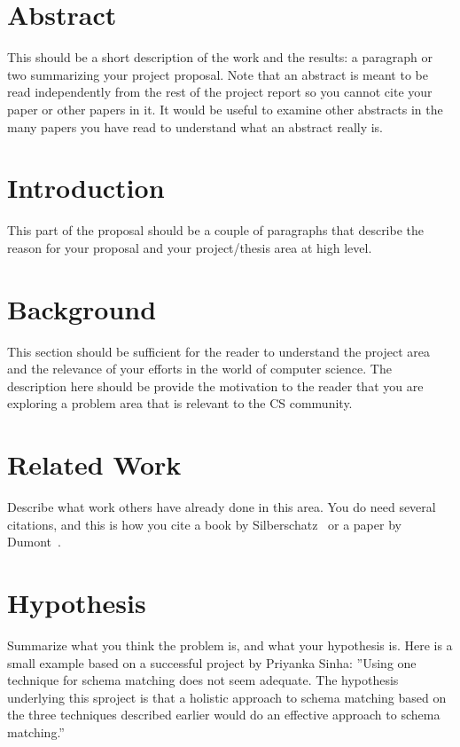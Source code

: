 \section*{Abstract}
This should be a short description of the work and the results: a paragraph 
or two summarizing your project proposal. Note that an abstract is meant to be read 
independently from the rest of the project report so you cannot cite your 
paper or other papers in it. It would be useful to examine other abstracts 
in the many papers you have read to understand what an abstract really is.
\vfill{}

\setcounter{page}{0} 
\newpage{}

\section{Introduction}
This part of the proposal should be a couple of paragraphs that
describe the reason for your proposal and your project/thesis area at
high level.

\section{Background}
This section should be sufficient for the reader to understand the
project area and the relevance of your efforts in the world of
computer science. The description here should be provide the
motivation to the reader that you are exploring a problem area that is
relevant to the CS community.


\section{Related Work}
Describe what work others have already done in this area. You do need
several citations, and this is how you cite a book by
Silberschatz~\cite{Silberschatz05-text} or a paper by
Dumont~\cite{Dumont2007-robots}.

\section{Hypothesis}
Summarize what you think the problem is, and what your hypothesis
is. Here is a small example based on a successful project by Priyanka
Sinha: ''Using one technique for schema matching does not seem
adequate. The hypothesis underlying this sproject is that a holistic
approach to schema matching based on the three techniques described
earlier would do an effective approach to schema matching.''

